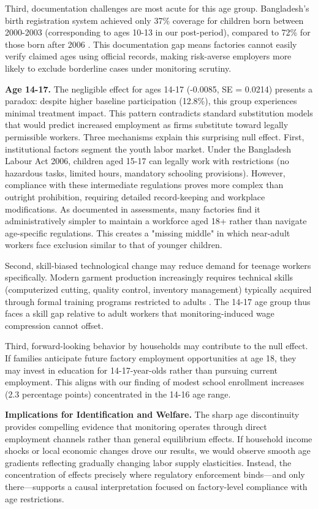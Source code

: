 \documentclass[12pt]{article}
\begin{document}
Third, documentation challenges are most acute for this age group. Bangladesh's birth registration system achieved only 37\% coverage for children born between 2000-2003 (corresponding to ages 10-13 in our post-period), compared to 72\% for those born after 2006 \citep{unicef2015every}. This documentation gap means factories cannot easily verify claimed ages using official records, making risk-averse employers more likely to exclude borderline cases under monitoring scrutiny.


\textbf{Age 14-17.} The negligible effect for ages 14-17 (-0.0085, SE = 0.0214) presents a paradox: despite higher baseline participation (12.8\%), this group experiences minimal treatment impact. This pattern contradicts standard substitution models \citep{basu1998economics} that would predict increased employment as firms substitute toward legally permissible workers. Three mechanisms explain this surprising null effect. First, institutional factors segment the youth labor market. Under the Bangladesh Labour Act 2006, children aged 15-17 can legally work with restrictions (no hazardous tasks, limited hours, mandatory schooling provisions). However, compliance with these intermediate regulations proves more complex than outright prohibition, requiring detailed record-keeping and workplace modifications. As documented in \cite{ilo2017age} assessments, many factories find it administratively simpler to maintain a workforce aged 18+ rather than navigate age-specific regulations. This creates a "missing middle" in which near-adult workers face exclusion similar to that of younger children.

Second, skill-biased technological change may reduce demand for teenage workers specifically. Modern garment production increasingly requires technical skills (computerized cutting, quality control, inventory management) typically acquired through formal training programs restricted to adults \citep{hasan2021skill}. The 14-17 age group thus faces a skill gap relative to adult workers that monitoring-induced wage compression cannot offset.

Third, forward-looking behavior by households may contribute to the null effect. If families anticipate future factory employment opportunities at age 18, they may invest in education for 14-17-year-olds rather than pursuing current employment. This aligns with our finding of modest school enrollment increases (2.3 percentage points) concentrated in the 14-16 age range.


\textbf{Implications for Identification and Welfare.} The sharp age discontinuity provides compelling evidence that monitoring operates through direct employment channels rather than general equilibrium effects. If household income shocks or local economic changes drove our results, we would observe smooth age gradients reflecting gradually changing labor supply elasticities. Instead, the concentration of effects precisely where regulatory enforcement binds—and only there—supports a causal interpretation focused on factory-level compliance with age restrictions.
\end{document}
